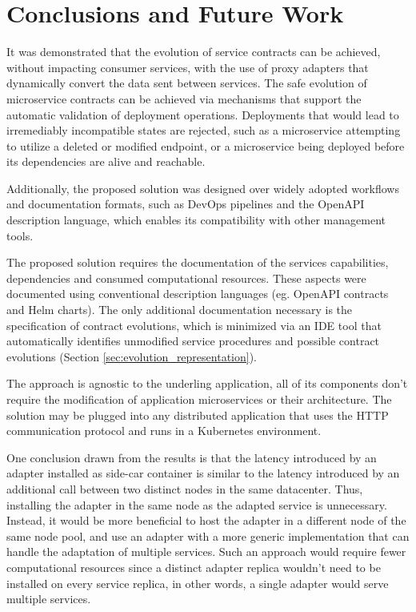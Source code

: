 
%

\chapter{Conclusions and Future Work}
\label{cha:conclusions and future work}

It was demonstrated that the evolution of service contracts can be achieved, without impacting consumer services,
with the use of proxy adapters that dynamically convert the data sent between services.
The safe evolution of microservice contracts can be achieved via mechanisms that
support the automatic validation of deployment operations.
Deployments that would lead to irremediably incompatible states are rejected, such as a
microservice attempting to utilize a deleted or modified endpoint, or a microservice being deployed before its dependencies are alive and reachable.

Additionally, the proposed solution was designed over widely adopted workflows and documentation formats, such as DevOps pipelines and the OpenAPI description language,
which enables its compatibility with other management tools.

The proposed solution requires the documentation of the services capabilities, dependencies and consumed computational resources.
These aspects were documented using conventional description languages (eg. OpenAPI contracts and Helm charts).
The only additional documentation necessary is the specification of contract evolutions, which is minimized
via an IDE tool that automatically identifies unmodified service procedures and possible contract evolutions (Section \ref{sec:evolution_representation}).

The approach is agnostic to the underling application, all of its components don't require the modification of application microservices or their architecture.
The solution may be plugged into any distributed application that uses the HTTP communication protocol and runs in a Kubernetes environment.

One conclusion drawn from the results is that the latency introduced by an adapter installed as side-car container is similar to the latency introduced by an additional call between two distinct nodes in the same datacenter.
Thus, installing the adapter in the same node as the adapted service is unnecessary.
Instead, it would be more beneficial to host the adapter in a different node of the same node pool, and use an adapter with a more generic implementation that can handle the adaptation of multiple services.
Such an approach would require fewer computational resources since a distinct adapter replica wouldn't need to be installed on every service replica, in other words, a single adapter would serve multiple services.

